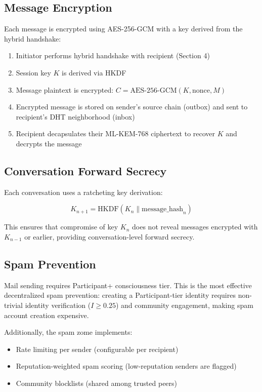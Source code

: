 \documentclass[11pt,twocolumn]{article}
\begin{document}
\subsection{Message Encryption}

Each message is encrypted using AES-256-GCM with a key derived from the
hybrid handshake:

\begin{enumerate}[nosep]
  \item Initiator performs hybrid handshake with recipient (Section 4)
  \item Session key $K$ is derived via HKDF
  \item Message plaintext is encrypted: $C = \text{AES-256-GCM}(K, \text{nonce}, M)$
  \item Encrypted message is stored on sender's source chain (outbox) and
    sent to recipient's DHT neighborhood (inbox)
  \item Recipient decapsulates their ML-KEM-768 ciphertext to recover $K$
    and decrypts the message
\end{enumerate}

\subsection{Conversation Forward Secrecy}

Each conversation uses a ratcheting key derivation:

\begin{equation}
  K_{n+1} = \text{HKDF}(K_n \| \text{message\_hash}_n)
\end{equation}

This ensures that compromise of key $K_n$ does not reveal messages encrypted
with $K_{n-1}$ or earlier, providing conversation-level forward secrecy.

\subsection{Spam Prevention}

Mail sending requires Participant+ consciousness tier. This is the most
effective decentralized spam prevention: creating a Participant-tier identity
requires non-trivial identity verification ($I \geq 0.25$) and community
engagement, making spam account creation expensive.

Additionally, the spam zome implements:
\begin{itemize}[nosep]
  \item Rate limiting per sender (configurable per recipient)
  \item Reputation-weighted spam scoring (low-reputation senders are flagged)
  \item Community blocklists (shared among trusted peers)
\end{itemize}
\end{document}
